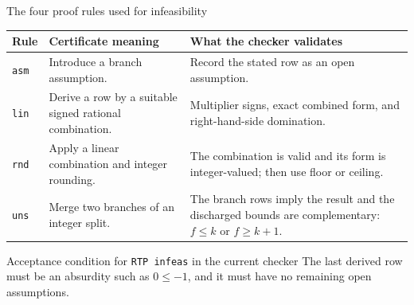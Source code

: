 \documentclass[aspectratio=169,11pt]{beamer}
\newcommand{\code}[1]{\texttt{#1}}
\begin{document}
\begin{frame}{The four proof rules used for infeasibility}
  \small
  \begin{tabular}{@{}p{}p{}p{}@{}}
    \toprule
    Rule & Certificate meaning & What the checker validates \\
    \midrule
    \code{asm} &
      Introduce a branch assumption. &
      Record the stated row as an open assumption. \\[0.5em]
    \code{lin} &
      Derive a row by a suitable signed rational combination. &
      Multiplier signs, exact combined form, and right-hand-side domination. \\[0.5em]
    \code{rnd} &
      Apply a linear combination and integer rounding. &
      The combination is valid and its form is integer-valued; then use
      floor or ceiling. \\[0.5em]
    \code{uns} &
      Merge two branches of an integer split. &
      The branch rows imply the result and the discharged bounds are
      complementary: $f\leq k$ or $f\geq k+1$. \\
    \bottomrule
  \end{tabular}

  \vspace{1em}
  \begin{block}{Acceptance condition for \code{RTP infeas} in the current checker}
    The last derived row must be an absurdity such as $0\leq -1$, and it must
    have no remaining open assumptions.
  \end{block}
\end{frame}
\end{document}
